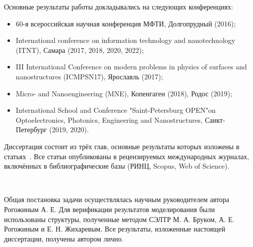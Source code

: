 Основные результаты работы докладывались на следующих конференциях:
\begin{itemize}
	\item 60-я всероссийская научная конференция МФТИ, Долгопрудный (2016);
	\item International conference on information technology and nanotechnology (ITNT), Самара (2017, 2018, 2020, 2022);
	\item III International Conference on modern problems in physics of surfaces and nanostructures (ICMPSN17), Ярославль (2017);
	\item Micro- and Nanoengineering (MNE), Копенгаген (2018), Родос (2019);
	\item International School and Conference "Saint-Petersburg OPEN"on Optoelectronics, Photonics, Engineering and Nanostructures, Санкт-Петербург (2019, 2020).	
\end{itemize}

Диссертация состоит из трёх глав, основные результаты которых изложены в статьях~\cite{my_CO, my_microlenses, my_evidence, my_detailed, my_review, my_MEE, my_Gvalue, my_microscopic, my_Isaev}. Все статьи опубликованы в рецензируемых международных журналах, включённых в библиографические базы (РИНЦ, Scopus, Web of Science).


\contribution\

Общая постановка задачи осуществлялась научным руководителем автора Рогожиным А. Е. Для верификации результатов моделирования были использованы структуры, полученные методом СЭЛТР М. А. Бруком, А. Е. Рогожиным и Е. Н. Жихаревым. Все результаты, изложенные настоящей диссертации, получены автором лично.

